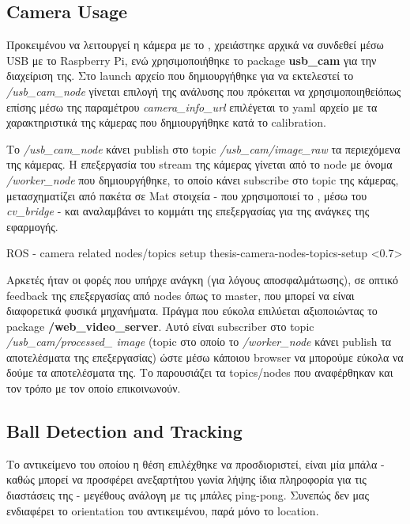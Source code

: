 \subsection{Camera Usage} \label{sec:camera-usage}
Προκειμένου να λειτουργεί η κάμερα με το , χρειάστηκε αρχικά να συνδεθεί μέσω USB με το Raspberry Pi, ενώ χρησιμοποιήθηκε το package \textbf{usb\_cam} για την διαχείριση της. Στο launch αρχείο που δημιουργήθηκε για να εκτελεστεί το \textit{/usb\_cam\_node} γίνεται επιλογή της ανάλυσης που πρόκειται να χρησιμοποιηθεί\udot όπως επίσης μέσω της παραμέτρου \textit{camera\_info\_url} επιλέγεται το yaml αρχείο με τα χαρακτηριστικά της κάμερας που δημιουργήθηκε κατά το calibration. 

Το \textit{/usb\_cam\_node} κάνει publish στο topic \textit{/usb\_cam/image\_raw} τα περιεχόμενα της κάμερας. Η επεξεργασία του stream της κάμερας γίνεται από το node με όνομα \textit{/worker\_node} που δημιουργήθηκε, το οποίο κάνει subscribe στο topic της κάμερας, μετασχηματίζει από πακέτα  σε Mat στοιχεία - που χρησιμοποιεί το ,  μέσω του \textit{cv\_bridge} - και αναλαμβάνει το κομμάτι της  επεξεργασίας για της ανάγκες της εφαρμογής. 

%
{ROS - camera related nodes/topics setup}%
{thesis-camera-nodes-topics-setup}%
<0.7>

Αρκετές ήταν οι φορές που υπήρχε ανάγκη (για λόγους αποσφαλμάτωσης), σε οπτικό feedback της  επεξεργασίας από nodes όπως το master, που μπορεί να είναι διαφορετικά φυσικά μηχανήματα. Πράγμα που εύκολα επιλύεται αξιοποιώντας το package \textbf{/web\_video\_server}. Αυτό είναι subscriber στο topic \textit{/usb\_\-cam/processed\_ image} (topic στο οποίο το \textit{/worker\_node} κάνει publish τα αποτελέσματα της επεξεργασίας) ώστε μέσω κάποιου browser να μπορούμε εύκολα να δούμε τα αποτελέσματα της. Το  παρουσιάζει τα topics/nodes που αναφέρθηκαν και τον τρόπο με τον οποίο επι\-κοι\-νω\-νούν.

\subsection{Ball Detection and Tracking}
Το αντικείμενο του οποίου η θέση επιλέχθηκε να προσδιοριστεί, είναι μία μπάλα - καθώς μπορεί να προσφέρει ανεξαρτήτου γωνία λήψης ίδια πληροφορία για τις διαστάσεις της - μεγέθους ανάλογη με τις μπάλες ping-pong. 
Συνεπώς δεν μας ενδιαφέρει το orientation του αντικειμένου, παρά μόνο το location.

